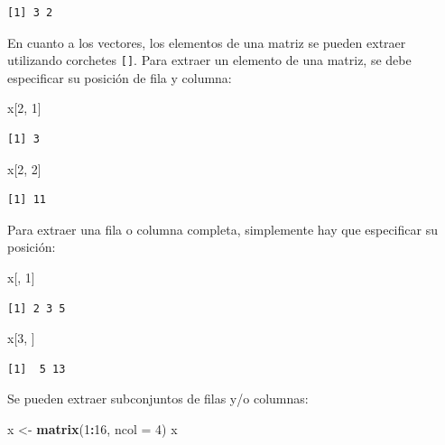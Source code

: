 \documentclass[
]{article}
\newenvironment{Shaded}{\begin{snugshade}}{\end{snugshade}}
\newcommand{\AttributeTok}[1]{\textcolor[rgb]{0.13,0.29,0.53}{#1}}
\newcommand{\DecValTok}[1]{\textcolor[rgb]{0.00,0.00,0.81}{#1}}
\newcommand{\FunctionTok}[1]{\textcolor[rgb]{0.13,0.29,0.53}{\textbf{#1}}}
\newcommand{\NormalTok}[1]{#1}
\newcommand{\OtherTok}[1]{\textcolor[rgb]{0.56,0.35,0.01}{#1}}
\newcommand{\SpecialCharTok}[1]{\textcolor[rgb]{0.81,0.36,0.00}{\textbf{#1}}}
\begin{document}
\begin{verbatim}
[1] 3 2
\end{verbatim}

En cuanto a los vectores, los elementos de una matriz se pueden extraer utilizando corchetes \texttt{{[}{]}}. Para extraer un elemento de una matriz, se debe especificar su posición de fila y columna:

\begin{Shaded}
\begin{Highlighting}[]
\NormalTok{x[}\DecValTok{2}\NormalTok{, }\DecValTok{1}\NormalTok{]}
\end{Highlighting}
\end{Shaded}

\begin{verbatim}
[1] 3
\end{verbatim}

\begin{Shaded}
\begin{Highlighting}[]
\NormalTok{x[}\DecValTok{2}\NormalTok{, }\DecValTok{2}\NormalTok{]}
\end{Highlighting}
\end{Shaded}

\begin{verbatim}
[1] 11
\end{verbatim}

Para extraer una fila o columna completa, simplemente hay que especificar su posición:

\begin{Shaded}
\begin{Highlighting}[]
\NormalTok{x[, }\DecValTok{1}\NormalTok{]}
\end{Highlighting}
\end{Shaded}

\begin{verbatim}
[1] 2 3 5
\end{verbatim}

\begin{Shaded}
\begin{Highlighting}[]
\NormalTok{x[}\DecValTok{3}\NormalTok{, ]}
\end{Highlighting}
\end{Shaded}

\begin{verbatim}
[1]  5 13
\end{verbatim}

Se pueden extraer subconjuntos de filas y/o columnas:

\begin{Shaded}
\begin{Highlighting}[]
\NormalTok{x }\OtherTok{\textless{}{-}} \FunctionTok{matrix}\NormalTok{(}\DecValTok{1}\SpecialCharTok{:}\DecValTok{16}\NormalTok{, }\AttributeTok{ncol =} \DecValTok{4}\NormalTok{)}
\NormalTok{x}
\end{Highlighting}
\end{Shaded}
\end{document}
